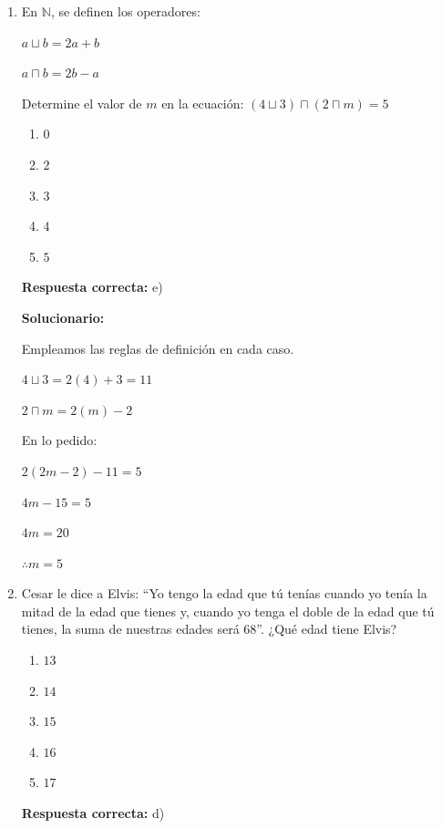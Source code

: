 \begin{enumerate}[resume]
	\vspace{2mm}
	\textbf{Solucionario:}
	
	Haciendo diferencia por cada dos términos:
	
	$15-12=3$
	
	$21-15=6$
	
	$33-21=12$
	
	Las diferencias se van duplicando.
	
	Entonces:
	
	$X-33=24$
	
	$X=24+33$
	
	$X=57$
	
	Luego:
	
	$105-57=48$
	
	$\therefore X=57$
	
	
	\vspace{6mm}
	
	\item En $\mathbb{N}$, se definen los operadores:
	
	$ a \sqcup b = 2a+b $
	
	$ a \sqcap b = 2b-a $
	
	Determine el valor de $m$ en la ecuación:
	$ (4 \sqcup 3)\sqcap(2 \sqcap m)=5 $
	\begin{enumerate}[label=\alph*)]
		\item $0$
		\item $2$
		\item $3$
		\item $4$
		\item $5$
	\end{enumerate}
	\textbf{Respuesta correcta:} e)
	
	\vspace{2mm}
	\textbf{Solucionario:}
	
	Empleamos las reglas de definición en cada caso.
	
	$4\sqcup3=2(4)+3=11$
	
	$2\sqcap m=2(m)-2$
	
	En lo pedido:
	
	$2(2m-2)-11=5$
	
	$4m-15=5$
	
	$4m=20$
	
	$\therefore m=5$
	
	

	
	\vspace{6mm}
	
	\item Cesar le dice a Elvis: ``Yo tengo la edad que tú tenías cuando yo tenía la mitad de la edad que tienes y, cuando yo tenga el doble de la edad que tú tienes, la suma de nuestras edades será $68$''. ¿Qué edad tiene Elvis?
	\begin{enumerate}[label=\alph*)]
		\item $13$
		\item $14$
		\item $15$
		\item $16$
		\item $17$
	\end{enumerate}
	\textbf{Respuesta correcta:} d)
	

\end{enumerate}
